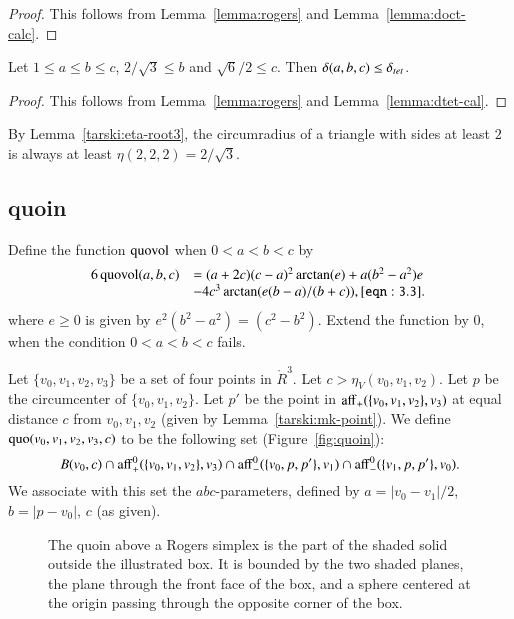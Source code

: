 \begin{proof} This follows from Lemma~\ref{lemma:rogers} and
Lemma~\ref{lemma:doct-calc}.
\end{proof}

\begin{lemma}
Let $1\le a \le b \le c$, $2/\sqrt{3}\le b$ and $\sqrt6/2\le c$.
Then $\delta(a,b,c) \le  \delta_{tet}$.
\end{lemma}

\begin{proof}  This follows from Lemma~\ref{lemma:rogers} and
Lemma~\ref{lemma:dtet-cal}.
\end{proof}

By Lemma~\ref{tarski:eta-root3}, the circumradius of a triangle
with sides at least $2$ is always at least $\eta(2,2,2)=2/\sqrt3$.



\subsection{quoin}

Define the function ${\operatorname{quovol}}$ when $0<a<b<c$ by
    \begin{equation}
    \begin{array}{lll}
    6\,\op{quovol}(a,b,c) &= (a+2c)  %
    (c-a)^2\arctan(e)
        +a(b^2-a^2)e\\&-4c^3\arctan(e(b-a)/(b+c)),
    \tlabel{eqn:3.3}
    \end{array}
    \end{equation}
where $e\ge0$ is given by $e^2(b^2-a^2)=(c^2-b^2)$.
Extend the function by $0$, when the condition $0<a<b<c$ fails.


\begin{definition}\label{def:quoin}
Let $\{v_0,v_1,v_2,v_3\}$ be a set of four points in $\ring{R}^3$.
Let $c>  \eta_V(v_0,v_1,v_2)$.  Let $p$ be the circumcenter
of $\{v_0,v_1,v_2\}$.  Let $p'$ be the point 
in ${\operatorname{aff}}_+(\{v_0,v_1,v_2\},v_3)$ at equal distance $c$
from $v_0,v_1,v_2$ (given by Lemma~\ref{tarski:mk-point}).
We define
${\operatorname{quo}}(v_0,v_1,v_2,v_3,c)$ to be the following set 
(Figure~\ref{fig:quoin}):
   $$
   B(v_0,c) \cap {\operatorname{aff}}_+^0(\{v_0,v_1,v_2\},v_3)
   \cap {\operatorname{aff}}_-^0(\{v_0,p,p'\},v_1) \cap
   {\operatorname{aff}}_-^0(\{v_1,p,p'\},v_0).
   $$
We associate with this set the $abc$-parameters, defined
by $a = |v_0-v_1|/2$, $b=|p-v_0|$, $c$ (as given).
\end{definition}

\begin{figure}[htb]
  \centering
  \caption{The quoin above a Rogers simplex is the part of the
  shaded solid outside
   the illustrated box.  It is bounded by the two
  shaded planes, the plane through
   the front face of the box, and a sphere
   centered at the origin passing through the opposite corner of the box.}
\end{figure}



